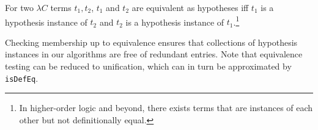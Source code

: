 \begin{definition}
For two $\lambda C$ terms $t_1, t_2$, $t_1$ and $t_2$ are equivalent as hypotheses
iff $t_1$ is a hypothesis instance of $t_2$ and $t_2$ is a hypothesis instance of $t_1$.\footnote{In
higher-order logic and beyond, there exists terms that are instances of each other but not definitionally equal.}
\end{definition}

Checking membership up to equivalence ensures that collections of hypothesis
instances in our algorithms are free of redundant entries. Note that equivalence testing
can be reduced to unification, which can in turn be approximated by \texttt{isDefEq}.
 